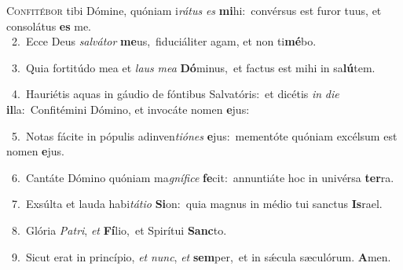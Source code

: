 \lettrine{\initial\textcolor{\initialcolor}{C}}{onfitébor} tibi Dómine, quóniam i\-\textit{rá}\-\textit{tus} \textit{es} \textbf{mi}\-hi:~\star convérsus est furor tuus, et consolátus \textbf{es} me.\\
{\numbfont\textcolor{\numbcolor}{~2.}}~Ecce Deus \textit{sal}\-\textit{vá}\textit{tor} \textbf{me}\-us,~\star fiduciáliter agam, et non ti\-\textbf{mé}\-bo.\par
{\numbfont\textcolor{\numbcolor}{~3.}}~Quia fortitúdo mea et \textit{laus} \textit{me}\-\textit{a} \textbf{Dó}\-minus,~\star et factus est mihi in sa\-\textbf{lú}\-tem.\par
{\numbfont\textcolor{\numbcolor}{~4.}}~Hauriétis aquas in gáudio de fóntibus Salvatóris:~\dagger et dicétis \textit{in} \textit{di}\-\textit{e} \textbf{il}\-la:~\star Confitémini Dómino, et invocáte nomen \textbf{e}\-jus:\par
{\numbfont\textcolor{\numbcolor}{~5.}}~Notas fácite in pópulis adinven\-\textit{ti}\-\textit{ó}\textit{nes} \textbf{e}\-jus:~\star mementóte quóniam excélsum est nomen \textbf{e}\-jus.\par
{\numbfont\textcolor{\numbcolor}{~6.}}~Cantáte Dómino quóniam ma\-\textit{gní}\-\textit{fi}\textit{ce} \textbf{fe}\-cit:~\star annuntiáte hoc in univérsa \textbf{ter}\-ra.\par
{\numbfont\textcolor{\numbcolor}{~7.}}~Exsúlta et lauda habi\-\textit{tá}\-\textit{ti}\textit{o} \textbf{Si}\-on:~\star quia magnus in médio tui sanctus \textbf{Is}\-rael.\par
{\numbfont\textcolor{\numbcolor}{~8.}}~Glória \textit{Pa}\-\textit{tri}, \textit{et} \textbf{Fí}\-lio,~\star et Spirítui \textbf{Sanc}\-to.\par
{\numbfont\textcolor{\numbcolor}{~9.}}~Sicut erat in princípio, \textit{et} \textit{nunc}\-, \textit{et} \textbf{sem}\-per,~\star et in sǽcula sæculórum. \textbf{A}\-men.\par
